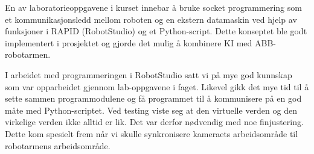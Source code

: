 \documentclass[conference]{IEEEtran}
\begin{document}
    En av laboratorieoppgavene i kurset innebar å bruke socket programmering som et kommunikasjonsledd mellom roboten og en ekstern datamaskin ved hjelp av funksjoner i RAPID (RobotStudio) og et Python-script. Dette konseptet ble godt implementert i prosjektet og gjorde det mulig å kombinere KI med ABB-robotarmen. 

    I arbeidet med programmeringen i RobotStudio satt vi på mye god kunnskap som var opparbeidet gjennom lab-oppgavene i faget. Likevel gikk det mye tid til å sette sammen programmodulene og få programmet til å kommunisere på en god måte med Python-scriptet. Ved testing viste seg at den virtuelle verden og den virkelige verden ikke alltid er lik. Det var derfor nødvendig med noe finjustering. Dette kom spesielt frem når vi skulle synkronisere kameraets arbeidsområde til robotarmens arbeidsområde. 




%
%
%




\newpage
\appendix

\end{document}

